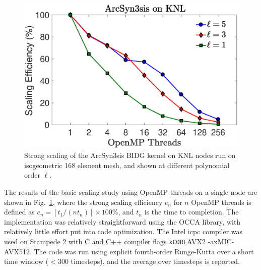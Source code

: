 \begin{figure}
\begin{center}
\includegraphics[width=0.99\linewidth]{./bidg_data/2nd_try/scaling_p}
\end{center}
\vspace*{-.5cm}
\caption{Strong scaling of the ArcSyn3sis BIDG kernel on KNL nodes run on
isogeometric 168 element mesh, and shown at different polynomial order $\ell$.}
\label{fig:bidg_scaling}
\end{figure}

 

The results of the basic scaling study using OpenMP threads on a single node are shown in
Fig.~\ref{fig:bidg_scaling}, where the strong scaling efficiency $e_{n}$ for
$n$ OpenMP threads is defined as $e_{n}= [t_{1}/(nt_{n})]\times 100\%$, and $t_n$ is the time to
completion. The implementation was relatively straightforward using the OCCA library, with relatively little effort put into code optimization.  The Intel icpc compiler was used on Stampede 2 with C and C++ compiler flags {\verb -xCORE-AVX2  -axMIC-AVX512}.  The code was run using explicit fourth-order Runge-Kutta over a short time window ($< 300$ timesteps), and the average over timesteps is reported.  


